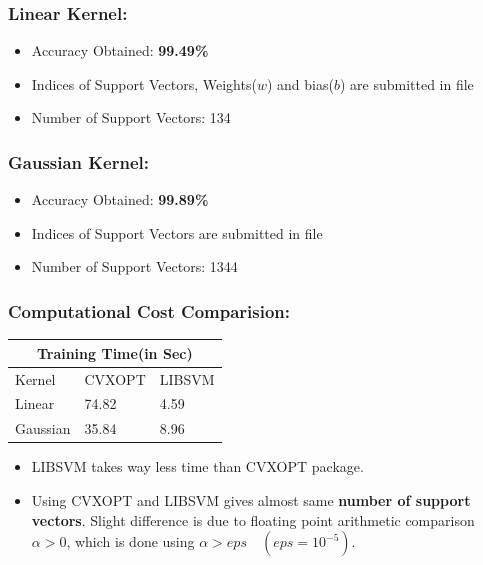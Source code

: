 \documentclass[a4 paper]{article}
\begin{document}
	\subsubsection*{\hspace*{3mm}Linear Kernel:}
	\begin{itemize}
	\item Accuracy Obtained: \textbf{99.49\%}
	\item Indices of Support Vectors, Weights($w$) and bias($b$) are submitted in file 
	\item Number of Support Vectors: 134
	\end{itemize}
	
	\subsubsection*{\hspace*{3mm}Gaussian Kernel:}
	\begin{itemize}
	\item Accuracy Obtained: \textbf{99.89\%}
	\item Indices of Support Vectors are submitted in file 
	\item Number of Support Vectors: 1344
	\end{itemize}

\subsubsection*{\hspace*{3mm}Computational Cost Comparision:}
\hskip4.0cm\begin{tabular}{ |p{2cm}||p{2cm}|p{2cm}|}
	 \hline
	 \multicolumn{3}{|c|}{Training Time(in Sec)} \\
	 \hline Kernel & CVXOPT & LIBSVM\\
	 \hline
	 Linear & 74.82 & 4.59\\
	 Gaussian & 35.84 & 8.96\\
	 \hline
\end{tabular}

\begin{itemize}
\item LIBSVM takes way less time than CVXOPT package.
\item Using CVXOPT and LIBSVM gives almost same \textbf{number of support vectors}. Slight difference is due to floating point arithmetic comparison $ \alpha > 0 $, which is done using $ \alpha > eps \quad (eps = 10^{-5}) $.
\end{itemize}
\end{document}
